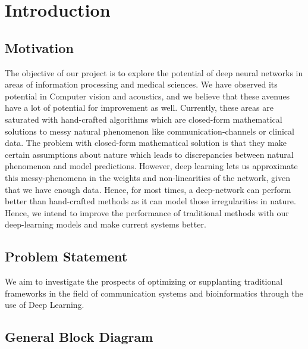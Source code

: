\chapter{Introduction} %
\label{Chapter1}
\lhead{} %

\section{Motivation}
The objective of our project is to explore the potential of deep neural networks in areas of information processing and medical sciences. We have observed its potential in Computer vision and acoustics, and we believe that these avenues have a lot of potential for improvement as well. Currently, these areas are saturated with hand-crafted algorithms which are closed-form mathematical solutions to messy natural phenomenon like communication-channels or clinical data. The problem with closed-form mathematical solution is that they make certain assumptions about nature which leads to discrepancies between natural phenomenon and model predictions. However, deep learning lets us approximate this messy-phenomena in the weights and non-linearities of the network, given that we have enough data. Hence, for most times, a deep-network can perform better than hand-crafted methods as it can model those irregularities in nature. Hence, we intend to improve the performance of traditional methods with our deep-learning models and make current systems better.\\

\section{Problem Statement}
We aim to investigate the prospects of optimizing or supplanting traditional frameworks in the field of communication systems and bioinformatics through the use of Deep Learning.\\

\section{General Block Diagram}
